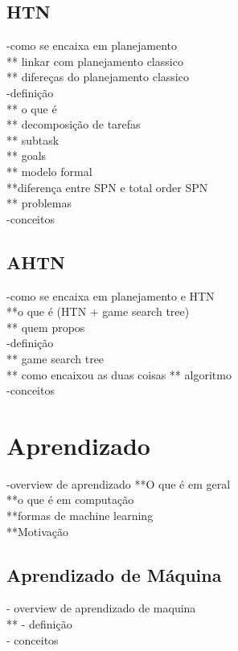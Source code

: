 \subsection{HTN} 
-como se encaixa em planejamento \\ 
** linkar com planejamento classico\\
** difereças do planejamento classico\\
-definição \\
** o que é\\ 
** decomposição de tarefas \\
** subtask \\
** goals \\
** modelo formal \\
**diferença entre SPN e total order SPN \\
** problemas \\

-conceitos \\

\subsection{AHTN} 
-como se encaixa em planejamento e HTN \\
**o que é (HTN + game search tree)\\
** quem propos\cite{ontanon2015adversarial} \\
-definição \\
** game search tree \\
** como encaixou as duas coisas
** algoritmo \\
-conceitos  \\

\section{Aprendizado} 
-overview de aprendizado
**O que é em geral \\
**o que é em computação \\
**formas de machine learning\\
**Motivação \\

\subsection{Aprendizado de Máquina} 
- overview de aprendizado de maquina \\
**
- definição \\
- conceitos

